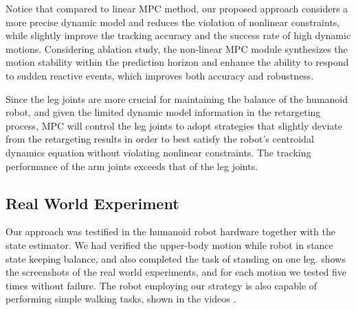 \documentclass[a4paper, 10pt, conference]{ieeeconf}      %
\begin{document}
Notice that compared to linear MPC method, our proposed approach considers a more precise dynamic model and reduces the violation of nonlinear constraints, while slightly improve the tracking accuracy and the success rate of high dynamic motions. Considering ablation study, the non-linear MPC module synthesizes the motion stability within the prediction horizon and enhance the ability to respond to sudden reactive events, which improves both accuracy and robustness.

Since the leg joints are more crucial for maintaining the balance of the humanoid robot, and given the limited dynamic model information in the retargeting process, MPC will control the leg joints to adopt strategies that slightly deviate from the retargeting results in order to best satisfy the robot's centroidal dynamics equation without violating nonlinear constraints. The tracking performance of the arm joints exceeds that of the leg joints. 


\subsection{Real World Experiment}
Our approach was testified in the humanoid robot hardware together with the state estimator. We had verified the upper-body motion while robot in stance state keeping balance, and also completed the task of standing on one leg.  shows the screenshots of the real world experiments, and for each motion we tested five times without failure. The robot employing our strategy is also capable of performing simple walking tasks, shown in the videos \cite{c38}. 
\end{document}
